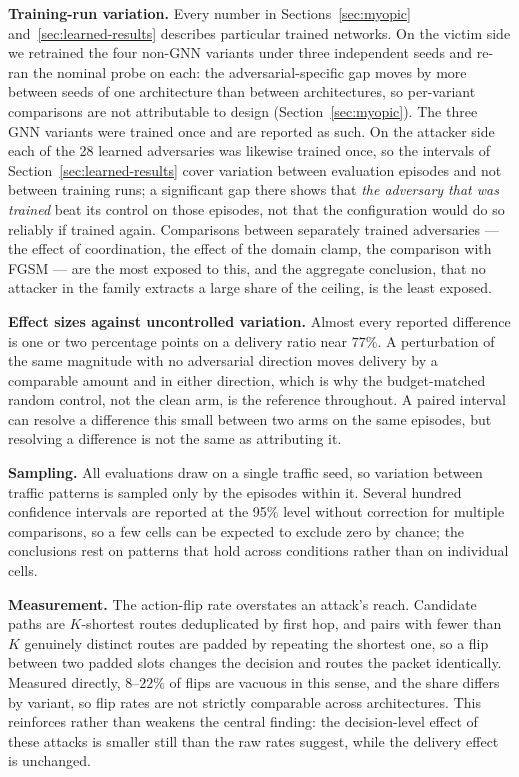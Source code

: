 \documentclass[10pt,journal,comsoc]{IEEEtran}
\begin{document}
\textbf{Training-run variation.}
\label{sec:seeds}
Every number in Sections~\ref{sec:myopic} and~\ref{sec:learned-results} describes particular
trained networks. On the victim side we retrained the four non-GNN variants under three
independent seeds and re-ran the nominal probe on each: the adversarial-specific gap moves
by more between seeds of one architecture than between architectures, so per-variant
comparisons are not attributable to design (Section~\ref{sec:myopic}). The three GNN variants
were trained once and are reported as such. On the attacker side each of the 28 learned
adversaries was likewise trained once, so the intervals of
Section~\ref{sec:learned-results} cover variation between evaluation episodes and not
between training runs; a significant gap there shows that \emph{the adversary that was
trained} beat its control on those episodes, not that the configuration would do so
reliably if trained again. Comparisons between separately trained adversaries --- the
effect of coordination, the effect of the domain clamp, the comparison with FGSM --- are
the most exposed to this, and the aggregate conclusion, that no attacker in the family
extracts a large share of the ceiling, is the least exposed.

\textbf{Effect sizes against uncontrolled variation.} Almost every reported difference is
one or two percentage points on a delivery ratio near $77\%$. A perturbation of the same
magnitude with no adversarial direction moves delivery by a comparable amount and in either
direction, which is why the budget-matched random control, not the clean arm, is the
reference throughout. A paired interval can resolve a difference this small between two arms
on the same episodes, but resolving a difference is not the same as attributing it.

\textbf{Sampling.} All evaluations draw on a single traffic seed, so variation between
traffic patterns is sampled only by the episodes within it. Several hundred confidence
intervals are reported at the 95\% level without correction for multiple comparisons, so a
few cells can be expected to exclude zero by chance; the conclusions rest on patterns that
hold across conditions rather than on individual cells.

\textbf{Measurement.} The action-flip rate overstates an attack's reach. Candidate paths are
$K$-shortest routes deduplicated by first hop, and pairs with fewer than $K$ genuinely
distinct routes are padded by repeating the shortest one, so a flip between two padded slots
changes the decision and routes the packet identically. Measured directly, $8$--$22\%$ of
flips are vacuous in this sense, and the share differs by variant, so flip rates are not
strictly comparable across architectures. This reinforces rather than weakens the central
finding: the decision-level effect of these attacks is smaller still than the raw rates
suggest, while the delivery effect is unchanged.
\end{document}
